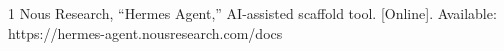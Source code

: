 \begin{thebibliography}{1}
 Nous Research, ``Hermes Agent,'' AI-assisted scaffold tool. [Online]. Available: https://hermes-agent.nousresearch.com/docs
\end{thebibliography}

